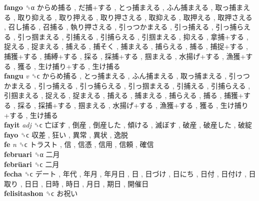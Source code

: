 \textbf{fango} ␝α   からめ捕る ,  だ捕+する ,  とっ捕まえる ,  ふん捕まえる ,  取っ捕まえる ,  取り抑える ,  取り押える ,  取り押さえる ,  取抑える ,  取押える ,  取押さえる ,  召し捕る ,  召捕る ,  執り押さえる ,  引っつかまえる ,  引っ捕える ,  引っ捕らえる ,  引っ掴まえる ,  引捕える ,  引捕らえる ,  引掴まえる ,  抑える ,  拿捕+する ,  捉える ,  捉まえる ,  捕える ,  捕そく ,  捕まえる ,  捕らえる ,  捕る ,  捕捉+する ,  捕獲+する ,  捕縛+する ,  採る ,  採捕+する ,  掴まえる ,  水揚げ+する ,  漁獲+する ,  獲る ,  生け捕り+する ,  生け捕る   \\
\textbf{fangu} \emph{v}  ␝ϲ   からめ捕る ,  とっ捕まえる ,  ふん捕まえる ,  取っ捕まえる ,  引っつかまえる ,  引っ捕える ,  引っ捕らえる ,  引っ掴まえる ,  引捕える ,  引捕らえる ,  引掴まえる ,  捉える ,  捉まえる ,  捕える ,  捕まえる ,  捕らえる ,  捕る ,  捕獲+する ,  採る ,  採捕+する ,  掴まえる ,  水揚げ+する ,  漁獲+する ,  獲る ,  生け捕り+する ,  生け捕る   \\
\textbf{fayit} \emph{adj}  ␝ϲ   亡ぼす ,  倒産 ,  倒産した ,  傾ける ,  滅ぼす ,  破産 ,  破産した ,  破綻   \\
\textbf{fayo} ␝ϲ   収差 ,  狂い ,  異常 ,  異状 ,  逸脱   \\
\textbf{fe} \emph{n}  ␝ϲ   トラスト ,  信 ,  信憑 ,  信用 ,  信頼 ,  確信   \\
\textbf{februari} ␝α   二月   \\
\textbf{febrüari} ␝ϲ   二月   \\
\textbf{fecha} ␝ϲ   デート ,  年代 ,  年月 ,  年月日 ,  日 ,  日づけ ,  日にち ,  日付 ,  日付け ,  日取り ,  日日 ,  日時 ,  時日 ,  月日 ,  期日 ,  開催日   \\
\textbf{felisitashon} ␝ϲ   お祝い   \\
